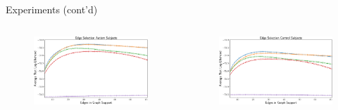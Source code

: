 \documentclass{beamer}
\begin{document}
\begin{frame}{Experiments (cont'd)}
\begin{columns}
\begin{column}{0.48\textwidth}
      \begin{figure}[ht]
        \centering
        \includegraphics[width=1\textwidth,keepaspectratio]{img/New_ABIDE_Autism_nsamps_35_repetitions_1479_errobar_1-crop}
      \end{figure}
    \end{column}
    \begin{column}{0.48\textwidth}
      \begin{figure}[ht]
        \centering
        \includegraphics[width=1\textwidth,keepaspectratio]{img/New_ABIDE_Control_nsamps_35_repetitions_1479_errobar_1-crop}
      \end{figure}
    \end{column}
  \end{columns}
\end{frame}
\end{document}
